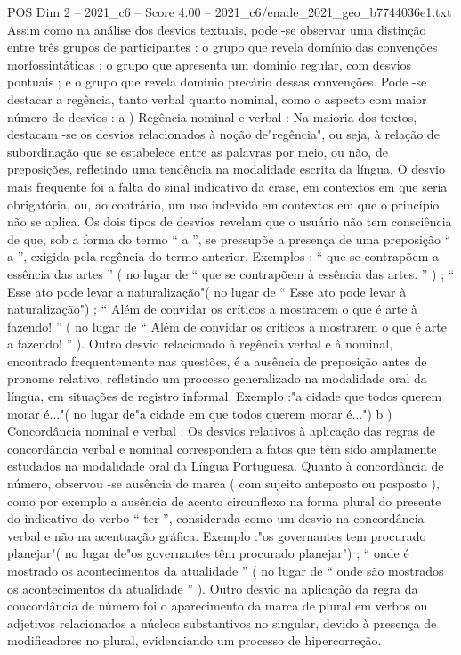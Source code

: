 \begin{textsample}{POS Dim 2 – 2021\_c6 – Score 4.00 – 2021\_c6/enade\_2021\_geo\_b7744036e1.txt}
Assim como na análise dos desvios textuais, pode -se observar uma distinção entre três grupos de participantes : o grupo que revela domínio das convenções morfossintáticas ; o grupo que apresenta um domínio regular, com desvios pontuais ; e o grupo que revela domínio precário dessas convenções.
Pode -se destacar a regência, tanto verbal quanto nominal, como o aspecto com maior número de desvios : a ) Regência nominal e verbal : Na maioria dos textos, destacam -se os desvios relacionados à noção de"regência", ou seja, à relação de subordinação que se estabelece entre as palavras por meio, ou não, de preposições, refletindo uma tendência na modalidade escrita da língua.
O desvio mais frequente foi a falta do sinal indicativo da crase, em contextos em que seria obrigatória, ou, ao contrário, um uso indevido em contextos em que o princípio não se aplica.
Os dois tipos de desvios revelam que o usuário não tem consciência de que, sob a forma do termo “ a ”, se pressupõe a presença de uma preposição “ a ”, exigida pela regência do termo anterior.
Exemplos : “ que se contrapõem a essência das artes ” ( no lugar de “ que se contrapõem à essência das artes. ” ) ; “ Esse ato pode levar a naturalização"( no lugar de “ Esse ato pode levar à naturalização") ; “ Além de convidar os críticos a mostrarem o que é arte à fazendo! ” ( no lugar de “ Além de convidar os críticos a mostrarem o que é arte a fazendo! ” ).
Outro desvio relacionado à regência verbal e à nominal, encontrado frequentemente nas questões, é a ausência de preposição antes de pronome relativo, refletindo um processo generalizado na modalidade oral da língua, em situações de registro informal.
Exemplo :"a cidade que todos querem morar é..."( no lugar de"a cidade em que todos querem morar é...") b ) Concordância nominal e verbal : Os desvios relativos à aplicação das regras de concordância verbal e nominal correspondem a fatos que têm sido amplamente estudados na modalidade oral da Língua Portuguesa.
Quanto à concordância de número, observou -se ausência de marca ( com sujeito anteposto ou posposto ), como por exemplo a ausência de acento circunflexo na forma plural do presente do indicativo do verbo “ ter ”, considerada como um desvio na concordância verbal e não na acentuação gráfica.
Exemplo :"os governantes tem procurado planejar"( no lugar de"os governantes têm procurado planejar") ; “ onde é mostrado os acontecimentos da atualidade ” ( no lugar de “ onde são mostrados os acontecimentos da atualidade ” ).
Outro desvio na aplicação da regra da concordância de número foi o aparecimento da marca de plural em verbos ou adjetivos relacionados a núcleos substantivos no singular, devido à presença de modificadores no plural, evidenciando um processo de hipercorreção.

\end{textsample}
